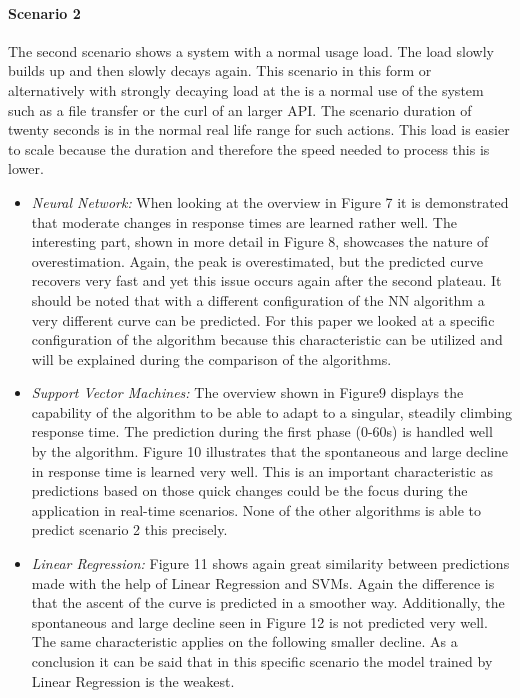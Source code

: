 \paragraph*{Scenario 2}
The second scenario shows a system with a normal usage load. The load slowly builds up and then slowly decays again. This scenario in this form or alternatively with strongly decaying load at the is a normal use of the system such as a file transfer or the curl of an larger API.  The scenario duration of twenty seconds is in the normal real life range for such actions. This load is easier to scale because the duration and therefore the speed needed to process this is lower.

\begin{itemize}
\item \textit{Neural Network:} When looking at the overview in Figure 7 it is demonstrated that moderate changes in response times are learned rather well. The interesting part, shown in more detail in Figure 8, showcases the nature of overestimation. Again, the peak is overestimated, but the predicted curve recovers very fast and yet this issue occurs again after the second plateau. It should be noted that with a different configuration of the NN algorithm a very different curve can be predicted. For this paper we looked at a specific configuration of the algorithm because this characteristic can be utilized and will be explained during the comparison of the algorithms.

\item \textit{Support Vector Machines:} The overview shown in Figure9 displays the capability of the algorithm to be able to adapt to a singular, steadily climbing response time. The prediction during the first phase (0-60s) is handled well by the algorithm. Figure 10 illustrates that the spontaneous and large decline in response time is learned very well. This is an important characteristic as predictions based on those quick changes could be the focus during the application in real-time scenarios. None of the other algorithms is able to predict scenario 2 this precisely.

\item \textit{Linear Regression:} Figure 11 shows again great similarity between predictions made with the help of Linear Regression and SVMs. Again the difference is that the ascent of the curve is predicted in a smoother way. Additionally, the spontaneous and large decline seen in Figure 12 is not predicted very well. The same characteristic applies on the following smaller decline. As a conclusion it can be said that in this specific scenario the model trained by Linear Regression is the weakest. 
\end{itemize}

